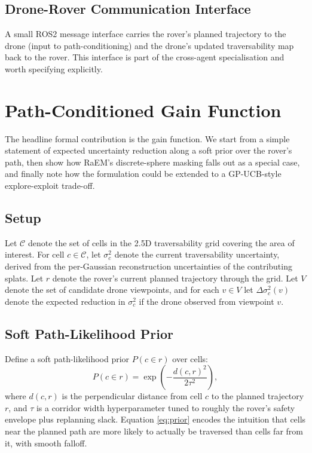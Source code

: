 \documentclass[conference]{IEEEtran}
\begin{document}
\subsection{Drone-Rover Communication Interface}
A small ROS2 message interface carries the rover's planned trajectory to the drone (input to path-conditioning) and the drone's updated traversability map back to the rover. This interface is part of the cross-agent specialisation and worth specifying explicitly.

\section{Path-Conditioned Gain Function}
The headline formal contribution is the gain function. We start from a simple statement of expected uncertainty reduction along a soft prior over the rover's path, then show how RaEM's discrete-sphere masking falls out as a special case, and finally note how the formulation could be extended to a GP-UCB-style explore-exploit trade-off.

\subsection{Setup}
Let $\mathcal{C}$ denote the set of cells in the 2.5D traversability grid covering the area of interest. For cell $c \in \mathcal{C}$, let $\sigma^2_c$ denote the current traversability uncertainty, derived from the per-Gaussian reconstruction uncertainties of the contributing splats. Let $r$ denote the rover's current planned trajectory through the grid. Let $V$ denote the set of candidate drone viewpoints, and for each $v \in V$ let $\Delta\sigma^2_c(v)$ denote the expected reduction in $\sigma^2_c$ if the drone observed from viewpoint $v$.

\subsection{Soft Path-Likelihood Prior}
Define a soft path-likelihood prior $P(c \in r)$ over cells:
\begin{equation}
P(c \in r) = \exp\left(-\frac{d(c, r)^2}{2\tau^2}\right),
\label{eq:prior}
\end{equation}
where $d(c, r)$ is the perpendicular distance from cell $c$ to the planned trajectory $r$, and $\tau$ is a corridor width hyperparameter tuned to roughly the rover's safety envelope plus replanning slack. Equation \eqref{eq:prior} encodes the intuition that cells near the planned path are more likely to actually be traversed than cells far from it, with smooth falloff.
\end{document}
